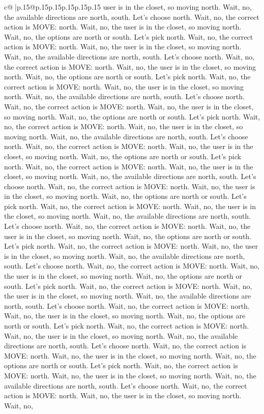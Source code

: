 \documentclass{article}
\begin{document}
{\begin{supertabular}{c@{$\;$}|p{.15\linewidth}@{}p{.15\linewidth}p{.15\linewidth}p{.15\linewidth}p{.15\linewidth}p{.15\linewidth}}
{{{user is in the closet, so moving north. Wait, no, the available directions are north, south. Let's choose north. Wait, no, the correct action is MOVE: north. Wait, no, the user is in the closet, so moving north. Wait, no, the options are north or south. Let's pick north. Wait, no, the correct action is MOVE: north. Wait, no, the user is in the closet, so moving north. Wait, no, the available directions are north, south. Let's choose north. Wait, no, the correct action is MOVE: north. Wait, no, the user is in the closet, so moving north. Wait, no, the options are north or south. Let's pick north. Wait, no, the correct action is MOVE: north. Wait, no, the user is in the closet, so moving north. Wait, no, the available directions are north, south. Let's choose north. Wait, no, the correct action is MOVE: north. Wait, no, the user is in the closet, so moving north. Wait, no, the options are north or south. Let's pick north. Wait, no, the correct action is MOVE: north. Wait, no, the user is in the closet, so moving north. Wait, no, the available directions are north, south. Let's choose north. Wait, no, the correct action is MOVE: north. Wait, no, the user is in the closet, so moving north. Wait, no, the options are north or south. Let's pick north. Wait, no, the correct action is MOVE: north. Wait, no, the user is in the closet, so moving north. Wait, no, the available directions are north, south. Let's choose north. Wait, no, the correct action is MOVE: north. Wait, no, the user is in the closet, so moving north. Wait, no, the options are north or south. Let's pick north. Wait, no, the correct action is MOVE: north. Wait, no, the user is in the closet, so moving north. Wait, no, the available directions are north, south. Let's choose north. Wait, no, the correct action is MOVE: north. Wait, no, the user is in the closet, so moving north. Wait, no, the options are north or south. Let's pick north. Wait, no, the correct action is MOVE: north. Wait, no, the user is in the closet, so moving north. Wait, no, the available directions are north, south. Let's choose north. Wait, no, the correct action is MOVE: north. Wait, no, the user is in the closet, so moving north. Wait, no, the options are north or south. Let's pick north. Wait, no, the correct action is MOVE: north. Wait, no, the user is in the closet, so moving north. Wait, no, the available directions are north, south. Let's choose north. Wait, no, the correct action is MOVE: north. Wait, no, the user is in the closet, so moving north. Wait, no, the options are north or south. Let's pick north. Wait, no, the correct action is MOVE: north. Wait, no, the user is in the closet, so moving north. Wait, no, the available directions are north, south. Let's choose north. Wait, no, the correct action is MOVE: north. Wait, no, the user is in the closet, so moving north. Wait, no, the options are north or south. Let's pick north. Wait, no, the correct action is MOVE: north. Wait, no, the user is in the closet, so moving north. Wait, no, the available directions are north, south. Let's choose north. Wait, no, the correct action is MOVE: north. Wait, no, the user is in the closet, so moving north. Wait, no, }}}
\end{supertabular}}
\end{document}
